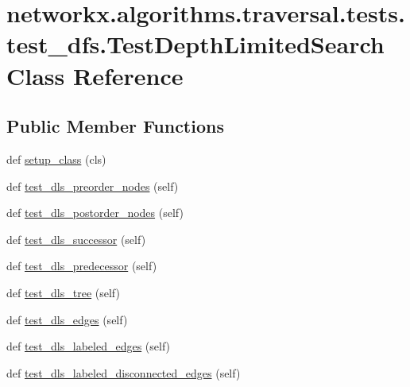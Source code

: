 \hypertarget{classnetworkx_1_1algorithms_1_1traversal_1_1tests_1_1test__dfs_1_1TestDepthLimitedSearch}{}\section{networkx.\+algorithms.\+traversal.\+tests.\+test\+\_\+dfs.\+Test\+Depth\+Limited\+Search Class Reference}
\label{classnetworkx_1_1algorithms_1_1traversal_1_1tests_1_1test__dfs_1_1TestDepthLimitedSearch}
\subsection*{Public Member Functions}
\begin{DoxyCompactItemize}
\item 
def \hyperlink{classnetworkx_1_1algorithms_1_1traversal_1_1tests_1_1test__dfs_1_1TestDepthLimitedSearch_a3a34321accfb618afaf68eb6fd878faf}{setup\+\_\+class} (cls)
\item 
def \hyperlink{classnetworkx_1_1algorithms_1_1traversal_1_1tests_1_1test__dfs_1_1TestDepthLimitedSearch_ad689a516ee91fe2cff21e62d021a0d98}{test\+\_\+dls\+\_\+preorder\+\_\+nodes} (self)
\item 
def \hyperlink{classnetworkx_1_1algorithms_1_1traversal_1_1tests_1_1test__dfs_1_1TestDepthLimitedSearch_a0172e421d8f861181f3b7a320e68ca1a}{test\+\_\+dls\+\_\+postorder\+\_\+nodes} (self)
\item 
def \hyperlink{classnetworkx_1_1algorithms_1_1traversal_1_1tests_1_1test__dfs_1_1TestDepthLimitedSearch_a8bc7d4b391e3db55792a449e28dafd45}{test\+\_\+dls\+\_\+successor} (self)
\item 
def \hyperlink{classnetworkx_1_1algorithms_1_1traversal_1_1tests_1_1test__dfs_1_1TestDepthLimitedSearch_ad316ba44d4dbd5d1d7817fa2a66dbec2}{test\+\_\+dls\+\_\+predecessor} (self)
\item 
def \hyperlink{classnetworkx_1_1algorithms_1_1traversal_1_1tests_1_1test__dfs_1_1TestDepthLimitedSearch_ab7eaeced8e135b4be167b5cfdad4015e}{test\+\_\+dls\+\_\+tree} (self)
\item 
def \hyperlink{classnetworkx_1_1algorithms_1_1traversal_1_1tests_1_1test__dfs_1_1TestDepthLimitedSearch_a0812e65cfc19288173bb187b421fbb02}{test\+\_\+dls\+\_\+edges} (self)
\item 
def \hyperlink{classnetworkx_1_1algorithms_1_1traversal_1_1tests_1_1test__dfs_1_1TestDepthLimitedSearch_afda7d20ac86b73b2fd48be2f36b4dbe7}{test\+\_\+dls\+\_\+labeled\+\_\+edges} (self)
\item 
def \hyperlink{classnetworkx_1_1algorithms_1_1traversal_1_1tests_1_1test__dfs_1_1TestDepthLimitedSearch_aa8aef72eff0f2b54aa2cd4994390d687}{test\+\_\+dls\+\_\+labeled\+\_\+disconnected\+\_\+edges} (self)
\end{DoxyCompactItemize}
